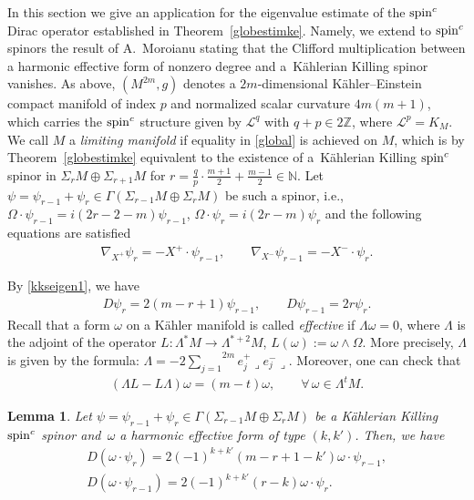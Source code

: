 \documentclass[pdftex]{sigma}
\numberwithin{equation}{section}
\newtheorem{lem}[thm]{Lemma}
\theoremstyle{definition}
\begin{document}
In this section we give an application for the eigenvalue estimate of the ${\mathop{\rm spin}^c}$ Dirac operator established in Theorem~\ref{globestimke}.
Namely, we extend to ${\mathop{\rm spin}^c}$ spinors the result of A.~Moroianu \cite{am} stating that
the Clif\/ford multiplication between a harmonic  ef\/fective form of nonzero degree and a~K\"ahlerian Killing spinor vanishes.
As above, $(M^{2m}, g)$ denotes a $2m$-dimensional K\"ahler--Einstein compact manifold of  index $p$ and normalized scalar curvature $4m(m+1)$, which carries the ${\mathop{\rm spin}^c}$ structure given by $\mathcal{L}^q$ with $q+p\in 2\mathbb{Z}$, where $\mathcal{L}^p=K_M$. We call $M$ a {\it limiting mani\-fold} if equality in \eqref{global} is achieved on $M$,  which is by Theorem~\ref{globestimke} equivalent to the existence of a~K\"ahlerian Killing ${\mathop{\rm spin}^c}$ spinor in $\Sigma_{r}M\oplus \Sigma_{r+1} M$ for $r=\frac{q}{p}\cdot\frac{m+1}{2}+\frac{m-1}{2}\in\mathbb{N}$.
Let $\psi=\psi_{r-1}+\psi_{r}\in \Gamma(\Sigma_{r-1} M \oplus \Sigma_{r} M)$ be such a spinor, i.e., $\Omega \cdot \psi_{r-1} = i (2r-2-m) \psi_{r-1}$, $\Omega \cdot \psi_{r} = i (2r-m) \psi_{r}$ and the following equations are satisf\/ied
\begin{gather*}
\nabla_{X^+}\psi_{r} =- X^+ \cdot \psi_{r-1},\qquad
\nabla_{X^-} \psi_{r-1} =- X^-\cdot \psi_{r}.
\end{gather*}

By \eqref{kkseigen1},  we  have
\begin{gather*}D\psi_{r}=2(m-r+1)\psi_{r-1}, \qquad D\psi_{r-1}=2r\psi_{r}.\end{gather*}
Recall that a form $\omega$ on a K\"ahler manifold is called {\it effective} if $\Lambda \omega = 0$, where $\Lambda$ is the adjoint of the operator
$L\colon\Lambda^{*} M \longrightarrow \Lambda^{*+2} M $, $L(\omega):=\omega\wedge\Omega$. More precisely, $\Lambda$ is given by the formula:
$\Lambda = -2 \overset{2m}{\underset{j=1}{\sum}} e_j^+  \lrcorner e_j^- \lrcorner$. Moreover, one can check that
\begin{gather*}%
(\Lambda L - L \Lambda ) \omega = (m-t) \omega, \qquad \forall\,  \omega \in \Lambda^t M.
\end{gather*}

\begin{lem}
Let $\psi=\psi_{r-1}+\psi_{r}\in\Gamma(\Sigma_{r-1} M \oplus \Sigma_{r} M)$ be a  K\"ahlerian Killing  ${\mathop{\rm spin}^c}$ spinor and~$\omega$ a harmonic effective form of type $(k, k')$. Then, we have
\begin{gather}\label{domeg1}
D(\omega\cdot\psi_{r})=2(-1)^{k+k'} (m-r+1-k') \omega\cdot\psi_{r-1},
\\ \label{domeg2}
D(\omega\cdot\psi_{r-1})=2(-1)^{k+k'} (r-k) \omega\cdot\psi_{r}.
\end{gather}
\end{lem}
\end{document}
